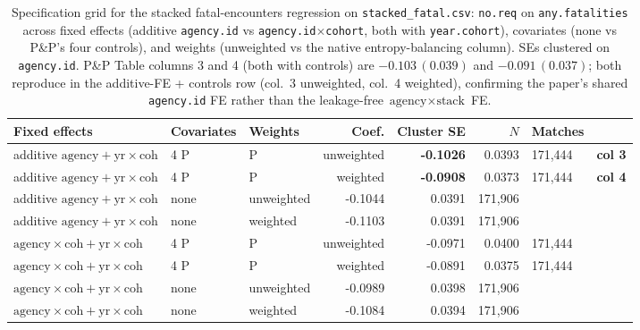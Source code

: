 \begin{table}[t]\centering
\caption{Specification grid for the stacked fatal-encounters regression on
\texttt{stacked\_fatal.csv}: \texttt{no.req} on \texttt{any.fatalities} across
fixed effects (additive \texttt{agency.id} vs \texttt{agency.id}$\times$\texttt{cohort},
both with \texttt{year.cohort}), covariates (none vs P\&P's four controls), and
weights (unweighted vs the native entropy-balancing column). SEs clustered on
\texttt{agency.id}. P\&P Table columns 3 and 4 (both with controls) are
$-0.103\,(0.039)$ and $-0.091\,(0.037)$; both reproduce in the additive-FE +
controls row (col.\ 3 unweighted, col.\ 4 weighted), confirming the paper's
shared \texttt{agency.id} FE rather than the leakage-free $\text{agency}\times
\text{stack}$ FE.}
\label{tab:spec-grid}
\begin{tabular}{lllrrrl}
\toprule
Fixed effects & Covariates & Weights & Coef. & Cluster SE & $N$ & Matches \\
\midrule
additive $\text{agency}+\text{yr}\times\text{coh}$ & 4 P&P & unweighted & \textbf{-0.1026} & 0.0393 & 171,444 & \textbf{col 3} \\
additive $\text{agency}+\text{yr}\times\text{coh}$ & 4 P&P & weighted & \textbf{-0.0908} & 0.0373 & 171,444 & \textbf{col 4} \\
additive $\text{agency}+\text{yr}\times\text{coh}$ & none & unweighted & -0.1044 & 0.0391 & 171,906 &  \\
additive $\text{agency}+\text{yr}\times\text{coh}$ & none & weighted & -0.1103 & 0.0391 & 171,906 &  \\
$\text{agency}\times\text{coh}+\text{yr}\times\text{coh}$ & 4 P&P & unweighted & -0.0971 & 0.0400 & 171,444 &  \\
$\text{agency}\times\text{coh}+\text{yr}\times\text{coh}$ & 4 P&P & weighted & -0.0891 & 0.0375 & 171,444 &  \\
$\text{agency}\times\text{coh}+\text{yr}\times\text{coh}$ & none & unweighted & -0.0989 & 0.0398 & 171,906 &  \\
$\text{agency}\times\text{coh}+\text{yr}\times\text{coh}$ & none & weighted & -0.1084 & 0.0394 & 171,906 &  \\
\bottomrule
\end{tabular}
\end{table}
